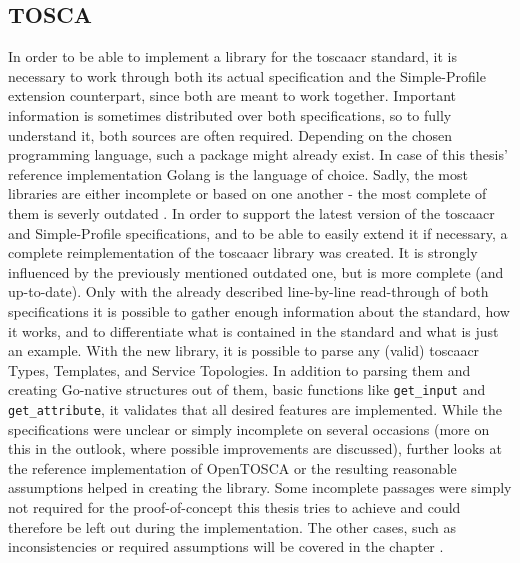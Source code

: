 \subsection{TOSCA}
In order to be able to implement a library for the \gls{toscaacr} standard, it is necessary to work through both its actual specification and the Simple-Profile extension counterpart, since both are meant to work together. Important information is sometimes distributed over both specifications, so to fully understand it, both sources are often required.
\newline
Depending on the chosen programming language, such a package might already exist. In case of this thesis' reference implementation Golang is the language of choice. Sadly, the most libraries are either incomplete or based on one another - the most complete of them is severly outdated \cite{github_toscalib_forks}.
\newline
In order to support the latest version of the \gls{toscaacr} and Simple-Profile specifications, and to be able to easily extend it if necessary, a complete reimplementation of the \gls{toscaacr} library was created. It is strongly influenced by the previously mentioned outdated one, but is more complete (and up-to-date). Only with the already described line-by-line read-through of both specifications it is possible to gather enough information about the standard, how it works, and to differentiate what is contained in the standard and what is just an example.
\newline
With the new library, it is possible to parse any (valid) \gls{toscaacr} Types, Templates, and Service Topologies.
In addition to parsing them and creating Go-native structures out of them, basic functions like \texttt{get_input} and \texttt{get_attribute}, it validates that all desired features are implemented. While the specifications were unclear or simply incomplete on several occasions (more on this in the outlook, where possible improvements are discussed), further looks at the reference implementation of OpenTOSCA or the resulting reasonable assumptions helped in creating the library. Some incomplete passages were simply not required for the proof-of-concept this thesis tries to achieve and could therefore be left out during the implementation. The other cases, such as inconsistencies or required assumptions will be covered in the chapter . %
\newline

